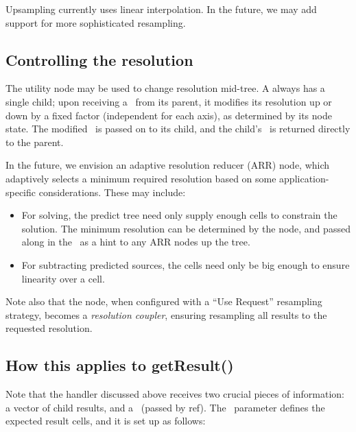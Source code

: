   Upsampling currently uses linear interpolation. In the future, we may add
  support for more sophisticated resampling.

\subsection{Controlling the resolution}

  The  utility node may be used to change resolution mid-tree. A
   always has a single child; upon receiving a \Request\ from its
  parent, it modifies its resolution up or down by a fixed factor (independent
  for each axis), as determined by its node state. The modified \Request\ is
  passed on to its child, and the child's \Result\ is returned directly to the
  parent.

  In the future, we envision an adaptive resolution reducer (ARR) node, which
  adaptively selects a minimum required resolution based on some
  application-specific considerations. These may include:

  \begin{itemize}
  
  \item For solving, the predict tree need only supply enough cells to
  constrain the solution. The minimum resolution can be determined by the
   node, and passed along in the \Request\ as a hint to any ARR nodes
  up the tree.
  
  \item For subtracting predicted sources, the cells need only be big enough
  to ensure linearity over a cell. 
  
  \end{itemize}
  
  Note also that the  node, when configured with a ``Use Request''
  resampling strategy, becomes a {\em resolution coupler}, ensuring resampling
  all results to the requested resolution.

\subsection{How this applies to getResult()}
  \label{sec:getResult}

  Note that the  handler discussed above receives two crucial
  pieces of information: a vector of child results, and a \Cells\ (passed by
  ref). The \Cells\ parameter defines the expected result cells, and it is
  set up as follows:

